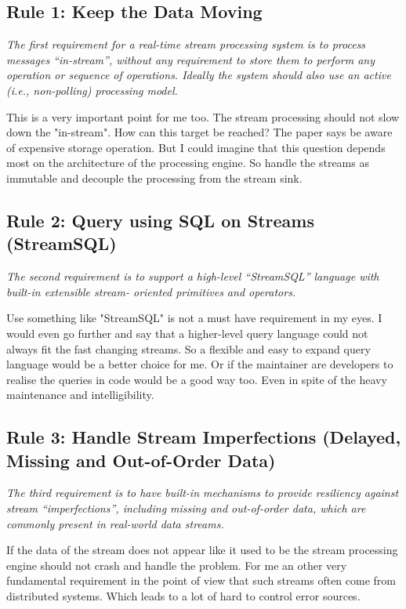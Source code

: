 \subsection{Rule 1: Keep the Data Moving}
\textit{The first requirement for a real-time stream processing
        system is to process messages “in-stream”, without any
        requirement to store them to perform any operation or
        sequence of operations. Ideally the system should also use
        an active (i.e., non-polling) processing model.}

\medskip
This is a very important point for me too. The stream processing should not slow down the "in-stream".
How can this target be reached? The paper says be aware of expensive storage operation.
But I could imagine that this question depends most on the architecture of the processing engine.
So handle the streams as immutable and decouple the processing from the stream sink.


\subsection{Rule 2: Query using SQL on Streams (StreamSQL)}
\textit{The second requirement is to support a high-level
        “StreamSQL” language with built-in extensible stream-
        oriented primitives and operators.}

\medskip
Use something like "StreamSQL" is not a must have requirement in my eyes.
I would even go further and say that a higher-level query language could not always fit the fast changing streams.
So a flexible and easy to expand query language would be a better choice for me.
Or if the maintainer are developers to realise the queries in code would be a good way too.
Even in spite of the heavy maintenance and intelligibility.

\newpage
\subsection{Rule 3: Handle Stream Imperfections (Delayed, Missing
and Out-of-Order Data)}
\textit{The third requirement is to have built-in mechanisms to
        provide resiliency against stream “imperfections”,
        including missing and out-of-order data, which are
        commonly present in real-world data streams.}

\medskip
If the data of the stream does not appear like it used to be the stream processing engine should not crash and handle the problem.
For me an other very fundamental requirement in the point of view that such streams often come from distributed systems.
Which leads to a lot of hard to control error sources.

